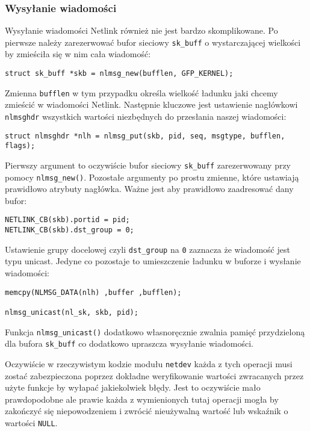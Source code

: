 \subsubsection{Wysyłanie wiadomości}

Wysyłanie wiadomości Netlink również nie jest bardzo skomplikowane. Po
pierwsze należy zarezerwować bufor sieciowy \texttt{sk\_buff} o
wystarczającej wielkości by zmieściła się w nim cała wiadomość:

\begin{verbatim}
struct sk_buff *skb = nlmsg_new(bufflen, GFP_KERNEL);
\end{verbatim}

Zmienna \texttt{bufflen} w tym przypadku określa wielkość ładunku jaki
chcemy zmieścić w wiadomości Netlink. Następnie kluczowe jest ustawienie
nagłówkowi \texttt{nlmsghdr} wszystkich wartości niezbędnych do
przesłania naszej wiadomości:

\begin{verbatim}
struct nlmsghdr *nlh = nlmsg_put(skb, pid, seq, msgtype, bufflen, flags);
\end{verbatim}

Pierwszy argument to oczywiście bufor sieciowy \texttt{sk\_buff}
zarezerwowany przy pomocy \texttt{nlmsg\_new()}. Pozostałe argumenty po
prostu zmienne, które ustawiają prawidłowo atrybuty nagłówka. Ważne jest
aby prawidłowo zaadresować dany bufor:

\begin{verbatim}
NETLINK_CB(skb).portid = pid;
NETLINK_CB(skb).dst_group = 0;
\end{verbatim}

Ustawienie grupy docelowej czyli \texttt{dst\_group} na \texttt{0}
zaznacza że wiadomość jest typu unicast. Jedyne co pozostaje to
umieszczenie ładunku w buforze i wysłanie wiadomości:

\begin{verbatim}
memcpy(NLMSG_DATA(nlh) ,buffer ,bufflen);

nlmsg_unicast(nl_sk, skb, pid);
\end{verbatim}

Funkcja \texttt{nlmsg\_unicast()} dodatkowo własnoręcznie zwalnia pamięć
przydzieloną dla bufora \texttt{sk\_buff} co dodatkowo upraszcza
wysyłanie wiadomości.

Oczywiście w rzeczywistym kodzie modułu \texttt{netdev} każda z tych
operacji musi zostać zabezpieczona poprzez dokładne weryfikowanie
wartości zwracanych przez użyte funkcje by wyłapać jakiekolwiek błędy.
Jest to oczywiście mało prawdopodobne ale prawie każda z wymienionych
tutaj operacji mogła by zakończyć się niepowodzeniem i zwrócić
nieużywalną wartość lub wskaźnik o wartości \texttt{NULL}.

